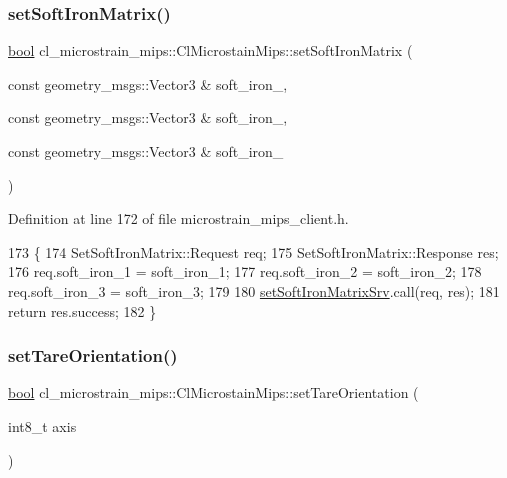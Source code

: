 \subsubsection{\texorpdfstring{set\+Soft\+Iron\+Matrix()}{setSoftIronMatrix()}}
{\footnotesize\ttfamily \hyperlink{classbool}{bool} cl\+\_\+microstrain\+\_\+mips\+::\+Cl\+Microstain\+Mips\+::set\+Soft\+Iron\+Matrix (\begin{DoxyParamCaption}\item[{const geometry\+\_\+msgs\+::\+Vector3 \&}]{soft\+\_\+iron\+\_,  }\item[{const geometry\+\_\+msgs\+::\+Vector3 \&}]{soft\+\_\+iron\+\_,  }\item[{const geometry\+\_\+msgs\+::\+Vector3 \&}]{soft\+\_\+iron\+\_ }\end{DoxyParamCaption})\hspace{0.3cm}{\ttfamily [inline]}}



Definition at line 172 of file microstrain\+\_\+mips\+\_\+client.\+h.


\begin{DoxyCode}
173     \{
174         SetSoftIronMatrix::Request req;
175         SetSoftIronMatrix::Response res;
176         req.soft\_iron\_1 = soft\_iron\_1;
177         req.soft\_iron\_2 = soft\_iron\_2;
178         req.soft\_iron\_3 = soft\_iron\_3;
179 
180         \hyperlink{classcl__microstrain__mips_1_1ClMicrostainMips_a2e46116a0dbc6acdf6384467d0c3a50d}{setSoftIronMatrixSrv}.call(req, res);
181         \textcolor{keywordflow}{return} res.success;
182     \}
\end{DoxyCode}
\mbox{\label{classcl__microstrain__mips_1_1ClMicrostainMips_a84173859b79a7bad8861b7ea14f15c6a}} 
\subsubsection{\texorpdfstring{set\+Tare\+Orientation()}{setTareOrientation()}}
{\footnotesize\ttfamily \hyperlink{classbool}{bool} cl\+\_\+microstrain\+\_\+mips\+::\+Cl\+Microstain\+Mips\+::set\+Tare\+Orientation (\begin{DoxyParamCaption}\item[{int8\+\_\+t}]{axis }\end{DoxyParamCaption})\hspace{0.3cm}{\ttfamily [inline]}}



